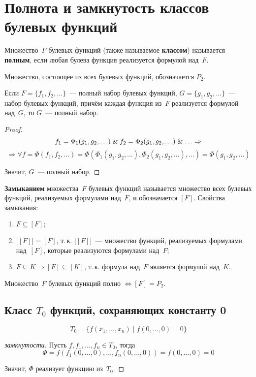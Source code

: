 \section{Полнота и замкнутость классов булевых функций}
Множество~$F$ булевых функций (также называемое \textbf{классом}) называется \textbf{полным}, если любая булева функция реализуется формулой над~$F$.

Множество, состоящее из всех булевых функций, обозначается $P_2$.

\begin{theorem}
Если $F = \{ f_1, f_2, \ldots \}$~--- полный набор булевых функций, $G = \{ g_1, g_2, \ldots \}$~--- набор булевых функций, причём каждая функция из~$F$ реализуется формулой над~$G$, то $G$~--- полный набор.
\end{theorem}
\begin{proof}
\begin{equation*}
f_1 = \Phi_1(g_1, g_2, \ldots) \mathrel{\&} f_2 = \Phi_2(g_1, g_2, \ldots) \mathrel{\&} \ldots \Rightarrow
\end{equation*}
\begin{equation*}
\Rightarrow \forall f = \Phi(f_1, f_2, \ldots) =
\Phi(\Phi_1(g_1, g_2, \ldots), \Phi_2(g_1, g_2, \ldots), \ldots) =
\Phi(g_1, g_2, \ldots)
\end{equation*}

Значит, $G$~--- полный набор.
\end{proof}

 \textbf{Замыканием} множества~$F$ булевых функций называется множество всех булевых функций, реализуемых формулами над~$F$, и обозначается $[F]$.
Свойства замыкания:
\begin{enumerate}
	\item $F \subseteq [F]$;
	\item $\bigl[ [F] \bigr] = [F]$, т.\,к. $\bigl[ [F] \bigr]$~--- множество функций, реализуемых формулами над~$[F]$, которые реализуются формулами над~$F$;
	\item $F \subseteq K \Rightarrow [F] \subseteq [K]$, т.\,к. формула над~$F$ является формулой над~$K$.
\end{enumerate}

\begin{statement}
Множество~$F$ булевых функций полно $\Leftrightarrow [F] = P_2$.
\end{statement}

\subsection{Класс \texorpdfstring{$T_0$}{} функций, сохраняющих константу 0}
\begin{equation*}
T_0 = \{ f(x_1, \ldots, x_n) \mid f(0, \ldots, 0) = 0 \}
\end{equation*}
\begin{proof}[замкнутости]
Пусть $f, f_1, \ldots, f_n \in T_0$, тогда
\begin{equation*}
\Phi =
f(f_1(0, \ldots, 0), \ldots, f_n(0, \ldots, 0)) =
f(0, \ldots, 0) = 0
\end{equation*}

Значит, $\Phi$ реализует функцию из~$T_0$.
\end{proof}

